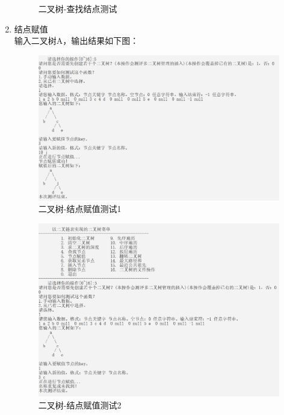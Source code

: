 \documentclass[supercite]{Experimental_Report}
\theoremstyle{definition}
\begin{document}
\begin{enumerate}
\begin{figure}[htb]
\begin{center}
				\caption{二叉树-查找结点测试}
				\label{fig2-4}
			\end{center}
		\end{figure}
		\newpage
	\item 结点赋值\\
	输入二叉树A，输出结果如下图：
		\begin{figure}[htb]
			\begin{center}
				\includegraphics[scale=0.50]{images/二叉树-节点赋值.png}
				\caption{二叉树-结点赋值测试1}
				\label{fig2-5.1}
			\end{center}
		\end{figure}
		\begin{figure}[htb]
			\begin{center}
				\includegraphics[scale=0.50]{images/二叉树-节点赋值异常.png}
				\caption{二叉树-结点赋值测试2}
				\label{fig2-5.2}
			\end{center}

\end{figure}
\end{enumerate}
\end{document}
